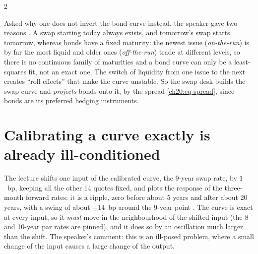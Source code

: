\begin{paracol}{2}
\begin{finance}
Asked why one does not invert the bond curve instead, the speaker gave two reasons . A swap
starting today always exists, and tomorrow's swap starts tomorrow, whereas bonds have a fixed maturity: the newest issue (\emph{on-the-run}) is by far the most liquid
and older ones (\emph{off-the-run}) trade at different levels, so there is no continuous family of maturities and a bond curve can only be a least-squares fit, not an exact one.
The switch of liquidity from one issue to the next creates ``roll effects'' that make the curve unstable. So the swap desk builds the swap curve and \emph{projects} bonds onto it, by the spread
\eqref{ch20:eq-spread}, since bonds are its preferred hedging instruments.
\end{finance}

\section{Calibrating a curve exactly is already ill-conditioned}\label{ch20:sec-curve}

The lecture shifts one input of the calibrated curve, the 9-year swap rate, by $1$~bp, keeping all the other 14 quotes fixed, and plots the response of the
three-month forward rates: it is a ripple, zero before about 5 years and after about 20 years, with a swing of about $\pm14$~bp around the 9-year point
. The curve is exact at every input, so it \emph{must} move in the neighbourhood of the shifted input (the 8- and 10-year par
rates are pinned), and it does so by an oscillation much larger than the shift. The speaker's comment: this is an ill-posed problem, where a
small change of the input causes a large change of the output.


\end{paracol}
